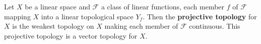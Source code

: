 Let $X$ be a linear space and $\mathcal{F}$ a class of linear functions, each member $f$ of $\mathcal{F}$ mapping $X$ into a linear topological space $Y_f$. Then the \textbf{projective topology} for $X$ is the weakest topology on $X$ making each member of $\mathcal{F}$ continuous. This projective topology is a vector topology for $X$.

